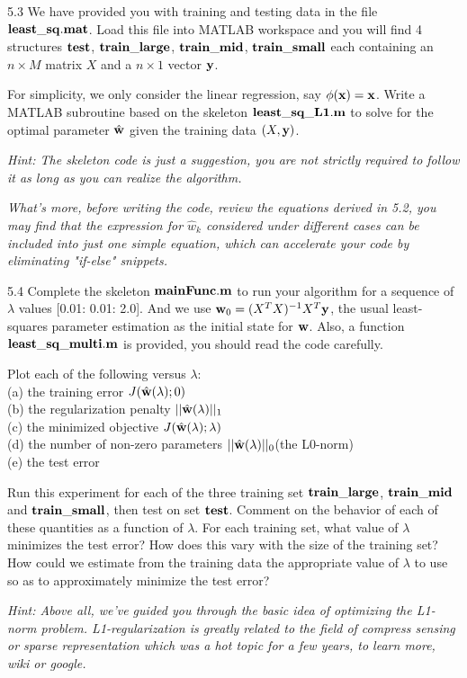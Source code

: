 \documentclass{article}
\theoremstyle{definition}
\theoremstyle{definition}
\theoremstyle{remark}
\begin{document}
5.3 We have provided you with training and testing data in the file $\bold{least\_sq.mat}$. Load this file into MATLAB workspace and you will find 4 structures $\bold{test}$, $\bold{train\_large}$, $\bold{train\_mid}$, $\bold{train\_small}$ each containing an $n\times M$ matrix $X$ and a $n\times 1$ vector $\bold{y}$.

For simplicity, we only consider the linear regression, say $\phi(\bold{x})=\bold{x}$. Write a MATLAB subroutine based on the skeleton $\bold{least\_sq\_L1.m}$ to solve for the optimal parameter $\hat{\bold{w}}$ given the training data $(X, \bold{y})$.

\emph{Hint: The skeleton code is just a suggestion, you are not strictly required to follow it as long as you can realize the algorithm.}

\emph{What's more, before writing the code, review the equations derived in 5.2, you may find that the expression for $\hat{w}_{k}$ considered under different cases can be included into just one simple equation, which can accelerate your code by eliminating "if-else" snippets.}

5.4 Complete the skeleton $\bold{mainFunc.m}$ to run your algorithm for a sequence of $\lambda$ values [0.01: 0.01: 2.0]. And we use $\bold{w}_{0}=(X^{T}X)^{-1}X^{T}\bold{y}$, the usual least-squares parameter estimation as the initial state for $\bold{w}$. Also, a function $\bold{least\_sq\_multi.m}$ is provided, you should read the code carefully.

Plot each of the following versus $\lambda$:\\
(a) the training error $J(\hat{\bold{w}}(\lambda);0)$\\
(b) the regularization penalty $||\hat{\bold{w}}(\lambda)||_{1}$\\
(c) the minimized objective $J(\hat{\bold{w}}(\lambda);\lambda)$\\
(d) the number of non-zero parameters $||\hat{\bold{w}}(\lambda)||_{0}$(the L0-norm)\\
(e) the test error

Run this experiment for each of the three training set $\bold{train\_large}$, $\bold{train\_mid}$ and $\bold{train\_small}$, then test on set $\bold{test}$. Comment on the behavior of each of these quantities as a function of $\lambda$. For each training set, what value of $\lambda$ minimizes the test error? How does this vary with the size of the training set? How could we estimate from the training data the appropriate value of $\lambda$ to use so as to approximately minimize the test error?

\emph{Hint: Above all, we've guided you through the basic idea of optimizing the L1-norm problem. L1-regularization is greatly related to the field of compress sensing or sparse representation which was a hot topic for a few years, to learn more, wiki or google.}



\end{document}
